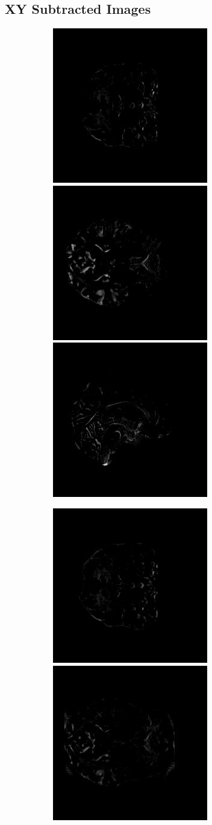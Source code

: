 \documentclass[11pt, fleqn, titlepage]{article}
\newcommand\skipperer{0.45pt}
\newcommand\ripperer{1.25pt}
\newcommand{\1}[1]{\mathds{1}\left[#1\right]}
\begin{document}
\subsection{XY Subtracted Images}\label{xy_subtracted_images}
\begin{figure}[H]
	\centering
	\begin{subfigure}[b]{0.8\textwidth}
		\centering
		\includegraphics[width=0.22\linewidth]{imgs/subtracted_images/xy/002_S_0559_xy_gts_comparison}
		\hskip\skipperer
		\includegraphics[width=0.22\linewidth]{imgs/subtracted_images/xy/002_S_0559_xz_gts_comparison}
		\hskip\skipperer
		\includegraphics[width=0.22\linewidth]{imgs/subtracted_images/xy/002_S_0559_yz_gts_comparison}
	\end{subfigure}
	\vskip\ripperer
	\begin{subfigure}[b]{0.8\textwidth}
		\centering
		\includegraphics[width=0.22\linewidth]{imgs/subtracted_images/xy/002_S_0559_xy_1.5_1.5gen_comparison}
		\hskip\skipperer
		\includegraphics[width=0.22\linewidth]{imgs/subtracted_images/xy/002_S_0559_xz_1.5_1.5gen_comparison}

\end{subfigure}
\end{figure}
\end{document}
